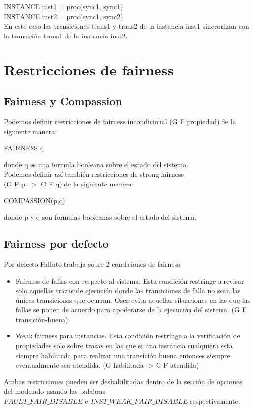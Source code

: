\documentclass[titlepage, 12pt]{book}
\begin{document}
\noindent INSTANCE inst1 = proc(sync1, sync1)\\
INSTANCE inst2 = proc(sync1, sync2)\\

En este caso las transiciones trans1 y trans2 de la instancia inst1 sincronizan con la transici\'on trans1 de la instancia inst2.\\




\section{Restricciones de fairness}
\subsection{Fairness y Compassion}

Podemos definir restricciones de fairness incondicional (G F propiedad) de la siguiente manera:
\begin{center}FAIRNESS q\end{center}
donde q es una formula booleana sobre el estado del sistema.\\

Podemos definir as\'i tambi\'en restricciones de strong fairness\\ (G F p -$>$ G F q) de la siguiente manera:
\begin{center}COMPASSION(p,q)\end{center}
donde p y q son formulas booleanas sobre el estado del sistema.\\




\subsection{Fairness por defecto}
Por defecto Falluto trabaja sobre 2 condiciones de fairness: 
\begin{itemize}
\item Fairness de fallas con respecto al sistema. Esta condici\'on restringe a revisar solo aquellas trazas de ejecuci\'on donde las transiciones de falla no sean las \'unicas transiciones que ocurran. Osea evita aquellas situaciones en las que las fallas se ponen de acuerdo para apoderarse de la ejecuci\'on del sistema. (G F transici\'on-buena)
\item Weak fairness para instancias. Esta condici\'on restringe a la verificaci\'on de propiedades solo sobre trazas en las que si una instancia cualquiera esta siempre habilitada para realizar una transici\'on buena entonces siempre eventualmente sea atendida. (G habilitada -> G F atendida)
\end{itemize}
Ambas restricciones pueden ser deshabilitadas dentro de la secci\'on de opciones del modelado usando las palabras\\ $FAULT\_FAIR\_DISABLE$ e $INST\_WEAK\_FAIR\_DISABLE$ respectivamente.
\end{document}
